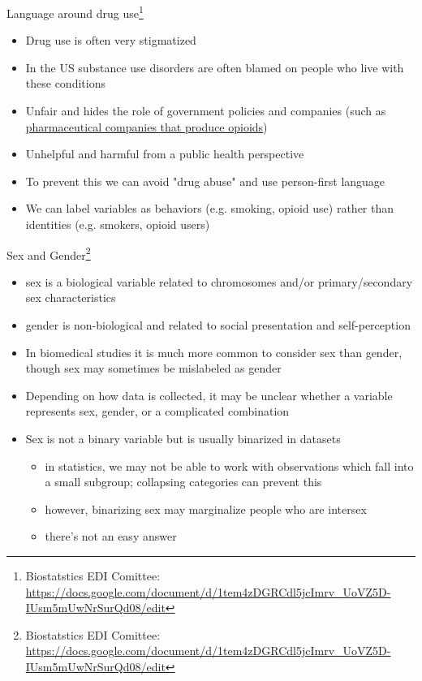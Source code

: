\documentclass[10pt,t]{beamer}
\begin{document}
\begin{frame}{Language around drug use\footnote{Biostatstics EDI Comittee: \url{https://docs.google.com/document/d/1tem4zDGRCdl5jcImrv_UoVZ5D-IUsm5mUwNrSurQd08/edit}}}
	\vspace{-5 mm}
	
	\begin{itemize}
	\item Drug use is often very stigmatized
	\medskip
	\item In the US substance use disorders are often blamed on people who live with these conditions
	\medskip
	\item Unfair and hides the role of government policies and companies (such as \textcolor{violet}{\href{https://www.washingtonpost.com/national/hammer-on-the-abusers-mass-attorney-general-alleges-purdue-pharma-tried-to-shift-blame-for-opioid-addiction/2019/01/15/4af25c4c-190c-11e9-88fe-f9f77a3bcb6c_story.html}{pharmaceutical companies that produce opioids}})
	\medskip
	\item Unhelpful and harmful from a public health perspective 
	\medskip
	\item To prevent this we can avoid "drug abuse" and use person-first language
	\medskip
	\item We can label variables as behaviors (e.g. smoking, opioid use) rather than identities (e.g. smokers, opioid users) 
\end{itemize}
\end{frame}

\begin{frame}{Sex and Gender\footnote{Biostatstics EDI Comittee: \url{https://docs.google.com/document/d/1tem4zDGRCdl5jcImrv_UoVZ5D-IUsm5mUwNrSurQd08/edit}}}
	\vspace{-7 mm}
	
	\begin{itemize}
	\item sex is a biological variable related to chromosomes and/or primary/secondary sex characteristics
	\smallskip
	\item gender is non-biological and related to social presentation and self-perception
	\smallskip
	\item In biomedical studies it is much more common to consider sex than gender, though sex may sometimes be mislabeled as gender
	\smallskip
	\item Depending on how data is collected, it may be unclear whether a variable represents sex, gender, or a complicated combination
	\smallskip
	\item Sex is not a binary variable but is usually binarized in datasets
	\smallskip
	\begin{itemize}
		\item in statistics, we may not be able to work with observations which fall into a small subgroup; collapsing categories can prevent this
		\smallskip
		\item however, binarizing sex may marginalize people who are intersex
		\smallskip
		\item there's not an easy answer
	\end{itemize}
	\end{itemize}
\end{frame}
\end{document}

